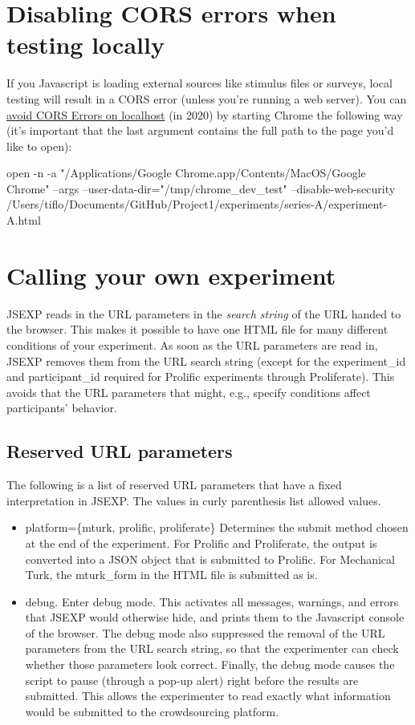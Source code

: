 \documentclass{article}
\newenvironment{code}%
   {\par\noindent\adjustbox{margin=1ex,bgcolor=shadecolor,margin=0ex \medskipamount}\bgroup\minipage\linewidth\codewrap}%
   {\endcodewrap\endminipage\egroup}
\begin{document}
\section{Disabling CORS errors when testing locally}
If you Javascript is loading external sources like stimulus files or surveys, local testing will result in a CORS error (unless you're running a web server). You can \href{https://medium.com/swlh/avoiding-cors-errors-on-localhost-in-2020-5a656ed8cefa}{avoid CORS Errors on localhost} (in 2020) by starting Chrome the following way (it's important that the last argument contains the full path to the page you'd like to open):

\begin{code}
open -n -a "/Applications/Google Chrome.app/Contents/MacOS/Google Chrome" --args --user-data-dir="/tmp/chrome_dev_test" --disable-web-security /Users/tiflo/Documents/GitHub/Project1/experiments/series-A/experiment-A.html
\end{code}


\section{Calling your own experiment}
JSEXP reads in the URL parameters in the {\em search string} of the URL handed to the browser. This makes it possible to have one HTML file for many different conditions of your experiment. As soon as the URL parameters are read in, JSEXP removes them from the URL search string (except for the experiment\_id and participant\_id required for Prolific experiments through Proliferate). This avoids that the URL parameters that might, e.g., specify conditions affect participants' behavior. 

\subsection{Reserved URL parameters}
The following is a list of reserved URL parameters that have a fixed interpretation in JSEXP. The values in curly parenthesis list allowed values.

\begin{itemize}
    \item platform=\{mturk, prolific, proliferate\} Determines the submit method chosen at the end of the experiment. For Prolific and Proliferate, the output is converted into a JSON object that is submitted to Prolific. For Mechanical Turk, the mturk\_form in the HTML file is submitted as is.
    \item debug. Enter debug mode. This activates all messages, warnings, and errors that JSEXP would otherwise hide, and prints them to the Javascript console of the browser. The debug mode also suppressed the removal of the URL parameters from the URL search string, so that the experimenter can check whether those parameters look correct. Finally, the debug mode causes the script to pause (through a pop-up alert) right before the results are submitted. This allows the experimenter to read exactly what information would be submitted to the crowdsourcing platform.
 \end{itemize}
\end{document}
